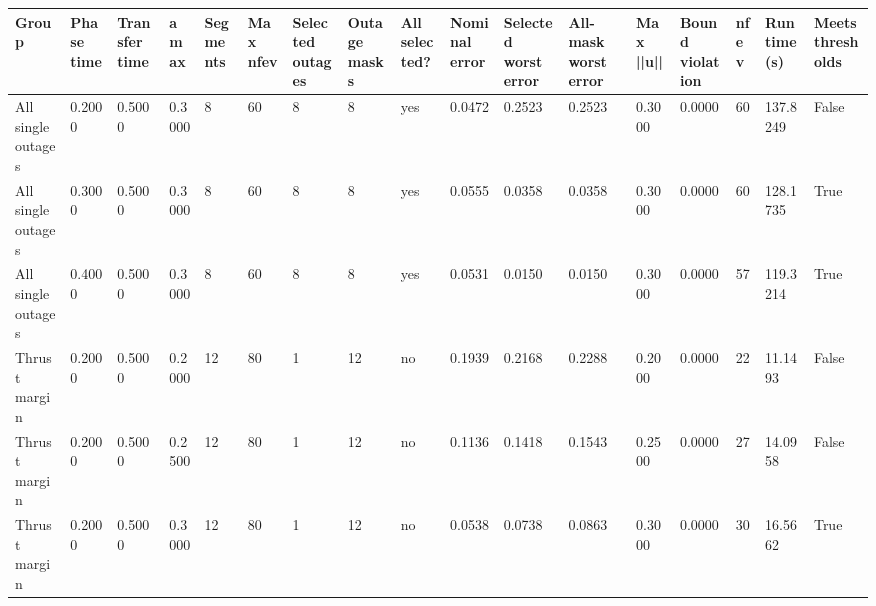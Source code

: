 \begin{tabular}{lllllllllllllllll}
\toprule
Group & Phase time & Transfer time & amax & Segments & Max nfev & Selected outages & Outage masks & All selected? & Nominal error & Selected worst error & All-mask worst error & Max ||u|| & Bound violation & nfev & Runtime (s) & Meets thresholds \\
\midrule
All single outages & 0.2000 & 0.5000 & 0.3000 & 8 & 60 & 8 & 8 & yes & 0.0472 & 0.2523 & 0.2523 & 0.3000 & 0.0000 & 60 & 137.8249 & False \\
All single outages & 0.3000 & 0.5000 & 0.3000 & 8 & 60 & 8 & 8 & yes & 0.0555 & 0.0358 & 0.0358 & 0.3000 & 0.0000 & 60 & 128.1735 & True \\
All single outages & 0.4000 & 0.5000 & 0.3000 & 8 & 60 & 8 & 8 & yes & 0.0531 & 0.0150 & 0.0150 & 0.3000 & 0.0000 & 57 & 119.3214 & True \\
Thrust margin & 0.2000 & 0.5000 & 0.2000 & 12 & 80 & 1 & 12 & no & 0.1939 & 0.2168 & 0.2288 & 0.2000 & 0.0000 & 22 & 11.1493 & False \\
Thrust margin & 0.2000 & 0.5000 & 0.2500 & 12 & 80 & 1 & 12 & no & 0.1136 & 0.1418 & 0.1543 & 0.2500 & 0.0000 & 27 & 14.0958 & False \\
Thrust margin & 0.2000 & 0.5000 & 0.3000 & 12 & 80 & 1 & 12 & no & 0.0538 & 0.0738 & 0.0863 & 0.3000 & 0.0000 & 30 & 16.5662 & True \\
\bottomrule
\end{tabular}
